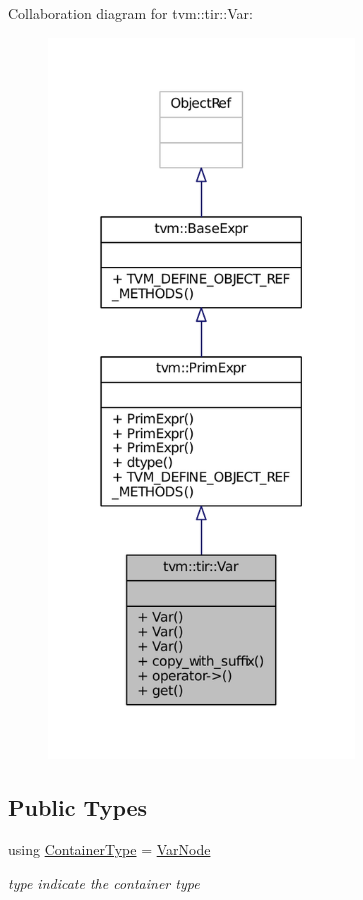 Collaboration diagram for tvm\+:\+:tir\+:\+:Var\+:
\nopagebreak
\begin{figure}[H]
\begin{center}
\leavevmode
\includegraphics[width=230pt]{classtvm_1_1tir_1_1Var__coll__graph}
\end{center}
\end{figure}
\subsection*{Public Types}
\begin{DoxyCompactItemize}
\item 
using \hyperlink{classtvm_1_1tir_1_1Var_a4b52ee26bf893b70e12087eb5700da6a}{Container\+Type} = \hyperlink{classtvm_1_1tir_1_1VarNode}{Var\+Node}
\begin{DoxyCompactList}\small\item\em type indicate the container type \end{DoxyCompactList}\end{DoxyCompactItemize}
